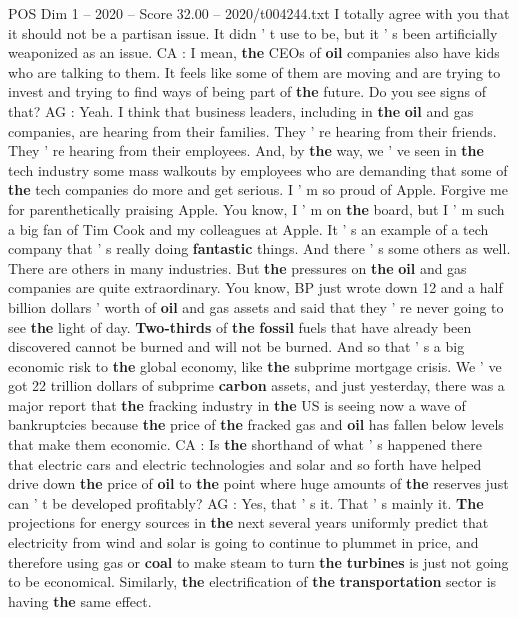 \begin{textsample}{POS Dim 1 – 2020 – Score 32.00 – 2020/t004244.txt}
I totally agree with you that it should not be a partisan issue.
It didn ' t use to be, but it ' s been artificially weaponized as an issue.
CA : I mean, \textbf{the} CEOs of \textbf{oil} companies also have kids who are talking to them.
It feels like some of them are moving and are trying to invest and trying to find ways of being part of \textbf{the} future.
Do you see signs of that?
AG : Yeah.
I think that business leaders, including in \textbf{the} \textbf{oil} and gas companies, are hearing from their families.
They ' re hearing from their friends.
They ' re hearing from their employees.
And, by \textbf{the} way, we ' ve seen in \textbf{the} tech industry some mass walkouts by employees who are demanding that some of \textbf{the} tech companies do more and get serious.
I ' m so proud of Apple.
Forgive me for parenthetically praising Apple.
You know, I ' m on \textbf{the} board, but I ' m such a big fan of Tim Cook and my colleagues at Apple.
It ' s an example of a tech company that ' s really doing \textbf{fantastic} things.
And there ' s some others as well.
There are others in many industries.
But \textbf{the} pressures on \textbf{the} \textbf{oil} and gas companies are quite extraordinary.
You know, BP just wrote down 12 and a half billion dollars ' worth of \textbf{oil} and gas assets and said that they ' re never going to see \textbf{the} light of day. \textbf{Two-thirds} of \textbf{the} \textbf{fossil} fuels that have already been discovered cannot be burned and will not be burned.
And so that ' s a big economic risk to \textbf{the} global economy, like \textbf{the} subprime mortgage crisis.
We ' ve got 22 trillion dollars of subprime \textbf{carbon} assets, and just yesterday, there was a major report that \textbf{the} fracking industry in \textbf{the} US is seeing now a wave of bankruptcies because \textbf{the} price of \textbf{the} fracked gas and \textbf{oil} has fallen below levels that make them economic.
CA : Is \textbf{the} shorthand of what ' s happened there that electric cars and electric technologies and solar and so forth have helped drive down \textbf{the} price of \textbf{oil} to \textbf{the} point where huge amounts of \textbf{the} reserves just can ' t be developed profitably?
AG : Yes, that ' s it.
That ' s mainly it. \textbf{The} projections for energy sources in \textbf{the} next several years uniformly predict that electricity from wind and solar is going to continue to plummet in price, and therefore using gas or \textbf{coal} to make steam to turn \textbf{the} \textbf{turbines} is just not going to be economical.
Similarly, \textbf{the} electrification of \textbf{the} \textbf{transportation} sector is having \textbf{the} same effect.

\end{textsample}
